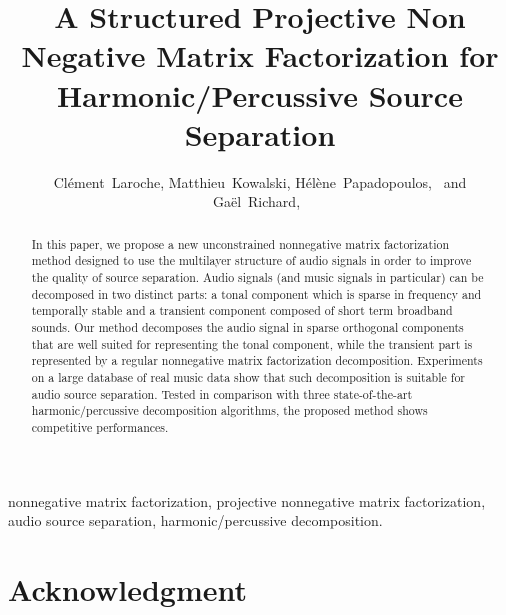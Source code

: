 \documentclass[journal]{IEEEtran}
\begin{document}
\title{A Structured Projective Non Negative Matrix Factorization for Harmonic/Percussive Source Separation}

\author{Cl\'{e}ment~Laroche,
        Matthieu~Kowalski,
        H\'{e}l\`{e}ne~Papadopoulos,~
        and Ga\"{el}~Richard,~%
        
}



\maketitle


\begin{abstract}
In this paper, we propose a new unconstrained nonnegative matrix factorization method designed to use the multilayer structure of audio signals in order to improve the quality of source separation. Audio signals (and music signals in particular) can be decomposed in two distinct parts: a tonal component which is sparse in frequency and temporally stable and a transient component composed of short term broadband sounds. Our method decomposes the audio signal in sparse orthogonal components that are well suited for representing the tonal component, while the transient part is represented by a regular nonnegative matrix factorization decomposition. Experiments on a large database of real music data show that such decomposition is suitable for audio source separation. Tested in comparison with three state-of-the-art harmonic/percussive decomposition algorithms, the proposed method shows competitive performances.
\end{abstract}


\begin{IEEEkeywords}
nonnegative matrix factorization, projective nonnegative matrix factorization, audio source separation, harmonic/percussive decomposition.
\end{IEEEkeywords}

















\section*{Acknowledgment}
\end{document}
